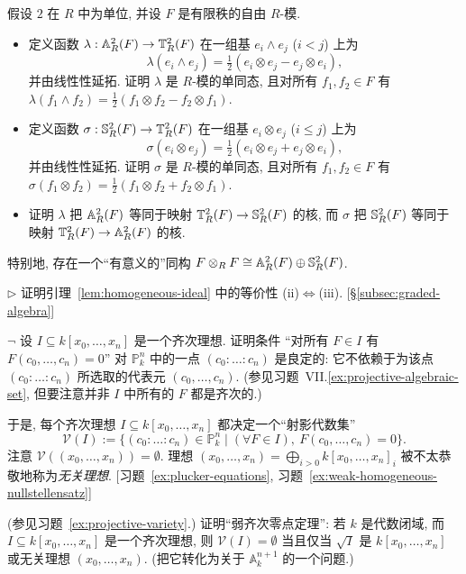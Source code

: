 \begin{prob}\label{ex:sym-alt-canonical-split}
假设 $2$ 在 $R$ 中为单位, 并设 $F$ 是有限秩的自由 $R$-模.
\begin{itemize}
\item 定义函数 $\lambda:\mathbb{A}_R^2(F)\to\mathbb{T}_R^2(F)$ 在一组基 $e_i\wedge e_j$ ($i<j$) 上为
\[
\lambda(e_i\wedge e_j)=\tfrac12(e_i\otimes e_j-e_j\otimes e_i),
\]
并由线性性延拓. 证明 $\lambda$ 是 $R$-模的单同态, 且对所有 $f_1,f_2\in F$ 有 $\lambda(f_1\wedge f_2)=\tfrac12(f_1\otimes f_2-f_2\otimes f_1)$.
\item 定义函数 $\sigma:\mathbb{S}_R^2(F)\to\mathbb{T}_R^2(F)$ 在一组基 $e_i\otimes e_j$ ($i\le j$) 上为
\[
\sigma(e_i\otimes e_j)=\tfrac12(e_i\otimes e_j+e_j\otimes e_i),
\]
并由线性性延拓. 证明 $\sigma$ 是 $R$-模的单同态, 且对所有 $f_1,f_2\in F$ 有 $\sigma(f_1\otimes f_2)=\tfrac12(f_1\otimes f_2+f_2\otimes f_1)$.
\item 证明 $\lambda$ 把 $\mathbb{A}_R^2(F)$ 等同于映射 $\mathbb{T}_R^2(F)\to\mathbb{S}_R^2(F)$ 的核, 而 $\sigma$ 把 $\mathbb{S}_R^2(F)$ 等同于映射 $\mathbb{T}_R^2(F)\to\mathbb{A}_R^2(F)$ 的核.
\end{itemize}
特别地, 存在一个``有意义的''同构 $F\otimes_R F\cong\mathbb{A}_R^2(F)\oplus\mathbb{S}_R^2(F)$.
\end{prob}

\begin{prob}\label{ex:homogeneous-equiv}
$\triangleright$ 证明引理~\ref{lem:homogeneous-ideal} 中的等价性 (ii)$\iff$(iii). [§\ref{subsec:graded-algebra}]
\end{prob}

\begin{prob}\label{ex:projective-variety}
$\neg$ 设 $I\subseteq k[x_0,\dots,x_n]$ 是一个齐次理想. 证明条件 ``对所有 $F\in I$ 有 $F(c_0,\dots,c_n)=0$'' 对 $\mathbb{P}_k^n$ 中的一点 $(c_0:\dots:c_n)$ 是良定的: 它不依赖于为该点 $(c_0:\dots:c_n)$ 所选取的代表元 $(c_0,\dots,c_n)$. (参见习题~VII.\ref{ex:projective-algebraic-set}, 但要注意并非 $I$ 中所有的 $F$ 都是齐次的.)

于是, 每个齐次理想 $I\subseteq k[x_0,\dots,x_n]$ 都决定一个``射影代数集''
\[
\mathscr{V}(I):=\{(c_0:\dots:c_n)\in\mathbb{P}_k^n\mid (\forall F\in I),\ F(c_0,\dots,c_n)=0\}.
\]
注意 $\mathscr{V}((x_0,\dots,x_n))=\emptyset$. 理想 $(x_0,\dots,x_n)=\bigoplus_{i>0}k[x_0,\dots,x_n]_i$ 被不太恭敬地称为\emph{无关理想}. [习题~\ref{ex:plucker-equations}, 习题~\ref{ex:weak-homogeneous-nullstellensatz}]
\end{prob}

\begin{prob}\label{ex:weak-homogeneous-nullstellensatz}
(参见习题~\ref{ex:projective-variety}.) 证明``弱齐次零点定理'': 若 $k$ 是代数闭域, 而 $I\subseteq k[x_0,\dots,x_n]$ 是一个齐次理想, 则 $\mathscr{V}(I)=\emptyset$ 当且仅当 $\sqrt{I}$ 是 $k[x_0,\dots,x_n]$ 或无关理想 $(x_0,\dots,x_n)$. (把它转化为关于 $\mathbb A_k^{n+1}$ 的一个问题.)
\end{prob}

